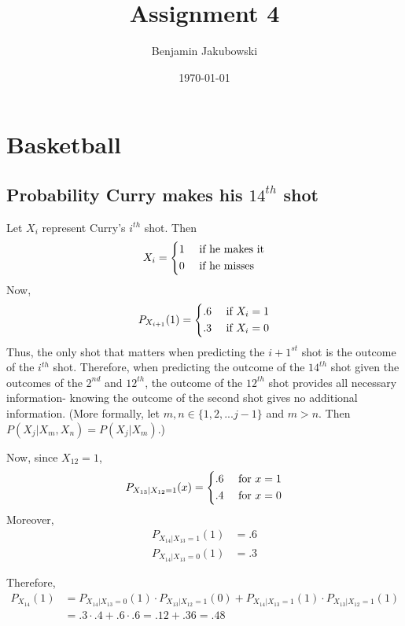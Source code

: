\documentclass[paper=a4, fontsize=11pt]{scrartcl} %
\title{	Assignment 4}
\author{Benjamin Jakubowski} %
\date{\normalsize\today} %
\numberwithin{equation}{section} %
\numberwithin{figure}{section} %
\numberwithin{table}{section} %
\begin{document}
\maketitle %


\section{Basketball}

\subsection{Probability Curry makes his $14^{th}$ shot}

Let $X_i$ represent Curry's $i^{th}$ shot. Then
\[
X_i = 
\begin{dcases}
   1 & \textrm{  if he makes it}\\
   0 & \textrm{  if he misses}\\
\end{dcases}
\]
Now,
\[
P_{X_{i+1}}(1) = 
\begin{dcases}
   .6 & \textrm{  if } X_i = 1\\
   .3 & \textrm{  if } X_i = 0\\
\end{dcases}
\]
Thus, the only shot that matters when predicting the $i+1^{st}$ shot is the outcome of the $i^{th}$ shot. Therefore, when predicting the outcome of the $14^{th}$ shot given the outcomes of the $2^{nd}$ and $12^{th}$, the outcome of the $12^{th}$ shot provides all necessary information- knowing the outcome of the second shot gives no additional information.  (More formally, let $m, n \in \{1,2,... j-1\}$ and $m > n$. Then $P(X_j | X_{m}, X_{n}) = P(X_j | X_{m})$.)

Now, since $X_{12} = 1$,
\[
P_{X_{13} | X_{12} = 1} (x) =
\begin{dcases}
   .6 & \textrm{  for } x = 1\\
   .4 & \textrm{  for } x = 0 
\end{dcases}
\]
Moreover,
\begin{align*}
P_{X_{14} | X_{13} = 1} (1) &= .6\\
P_{X_{14} | X_{13} = 0} (1) &= .3
\end{align*}

Therefore,
\begin{align*}
P_{X_{14}} (1) &= P_{X_{14} | X_{13} = 0} (1) \cdot  P_{X_{13} | X_{12} = 1} (0) + P_{X_{14} | X_{13} = 1} (1) \cdot  P_{X_{13} | X_{12} = 1} (1)\\
   &= .3 \cdot .4 + .6 \cdot .6 = .12 + .36 = .48
\end{align*}
\end{document}
